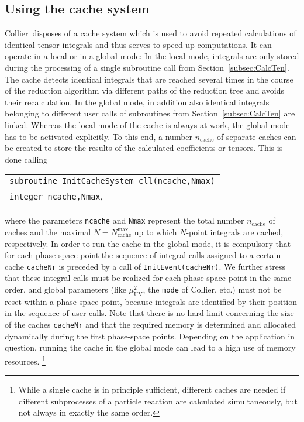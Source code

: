 \documentclass[preprint,sort&compress,12pt]{elsarticle}
\makeatletter
\def\bce{\begin{center}}
\def\ece{\end{center}}
\def\refse#1{\mbox{Section~\ref{#1}}}
\newcommand{\UV}{{\mathrm{UV}}}
\newcommand{\collier}{{\sc Collier}}
\newlength{\parwidth}\newlength{\colonewidth}%
\newcommand{\cpcsub}[1]
{%
\setlength{\parwidth}{\textwidth}\addtolength{\parwidth}{-2.1em}%
\bce
\begin{tabular}[t]{@{}p{\parwidth}@{}}
#1
\end{tabular}
\ece
}%
\makeatother
\begin{document}
\subsection{Using the cache system}
\label{subsec:cache} 
\collier\ disposes of a cache system which is used to avoid repeated calculations of identical tensor integrals
and thus serves to speed up computations. It can operate in a local or in a global mode: 
In the local mode,
integrals are only stored during the processing of a single subroutine 
call from \refse{subsec:CalcTen}.
The cache detects identical integrals that 
are reached several times 
in the course of the reduction algorithm 
via different paths
of the reduction tree and avoids their recalculation. In the global mode, in addition also identical integrals belonging 
to different user calls of subroutines from \refse{subsec:CalcTen} are linked. Whereas the local mode of the cache is always at work, 
the global mode has to be activated explicitly. To this end, a number $n_\textrm{cache}$ of separate caches can be created
to store the results of the calculated coefficients or tensors. This is done calling
\cpcsub{
{\tt subroutine  InitCacheSystem\_cll(ncache,Nmax)}\\
{\tt integer ncache,Nmax}\;, \\
}
where the parameters {\tt ncache} and {\tt Nmax} 
represent 
the total number $n_\textrm{cache}$ of caches and the maximal $N=N^\textrm{max}_\textrm{cache}$ up to which
$N$-point integrals are cached, respectively. 
In order to run the cache in the global mode, it is compulsory
that for each phase-space point
the sequence of integral calls assigned to a certain cache {\tt cacheNr} is preceded by a call of {\tt InitEvent(cacheNr)}. 
We further stress that these integral calls must be realized for each 
phase-space point in the same order, and global parameters 
(like $\mu_\UV^2$, the {\tt mode} of \collier, etc.) must not be reset
within a phase-space point, 
because integrals are identified by their position in the sequence of
user calls. Note that there is no hard limit concerning the size of the caches {\tt cacheNr} 
and that the required memory is determined and allocated dynamically during the first phase-space points.
Depending on the application in question,
running the cache
in the global mode can lead to a high use of memory resources.%
\footnote{While a single cache is in principle sufficient, different
  caches are needed if different subprocesses of a particle reaction are calculated
  simultaneously, but not always in exactly the same order.}
\end{document}
